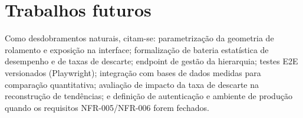 \section{Trabalhos futuros}

Como desdobramentos naturais, citam-se: parametrização da geometria de
rolamento e exposição na interface; formalização de bateria estatística de
desempenho e de taxas de descarte; endpoint de gestão da hierarquia; testes E2E
versionados (Playwright); integração com bases de dados medidas para
comparação quantitativa; avaliação de impacto da taxa de descarte na
reconstrução de tendências; e definição de autenticação e ambiente de
produção quando os requisitos NFR-005/NFR-006 forem fechados.
